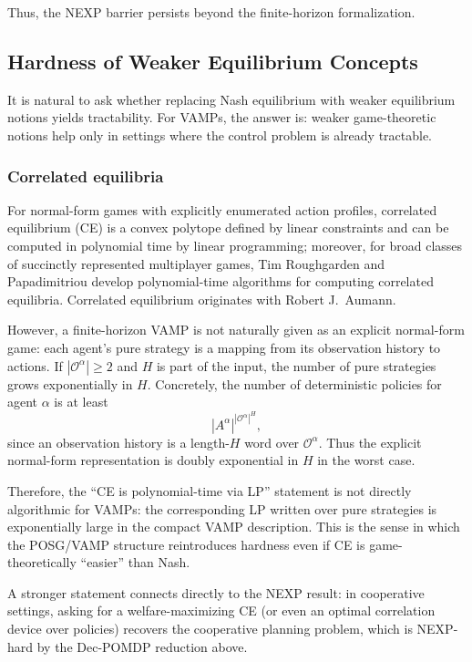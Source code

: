 Thus, the NEXP barrier persists beyond the finite-horizon formalization.

\subsection{Hardness of Weaker Equilibrium Concepts}

It is natural to ask whether replacing Nash equilibrium with weaker equilibrium notions yields tractability. For VAMPs, the answer is: weaker game-theoretic notions help only in settings where the control problem is already tractable.

\subsubsection{Correlated equilibria}

For normal-form games with explicitly enumerated action profiles, correlated equilibrium (CE) is a convex polytope defined by linear constraints and can be computed in polynomial time by linear programming; moreover, for broad classes of succinctly represented multiplayer games, Tim Roughgarden and Papadimitriou develop polynomial-time algorithms for computing correlated equilibria. Correlated equilibrium originates with Robert J.\ Aumann.

However, a finite-horizon VAMP is not naturally given as an explicit normal-form game: each agent's pure strategy is a mapping from its observation history to actions. If \(|\mathcal O^\alpha|\ge 2\) and \(H\) is part of the input, the number of pure strategies grows exponentially in \(H\). Concretely, the number of deterministic policies for agent \(\alpha\) is at least
\[
|A^\alpha|^{|\mathcal O^\alpha|^H},
\]
since an observation history is a length-\(H\) word over \(\mathcal O^\alpha\). Thus the explicit normal-form representation is doubly exponential in \(H\) in the worst case.

Therefore, the ``CE is polynomial-time via LP'' statement is not directly algorithmic for VAMPs: the corresponding LP written over pure strategies is exponentially large in the compact VAMP description. This is the sense in which the POSG/VAMP structure reintroduces hardness even if CE is game-theoretically ``easier'' than Nash.

A stronger statement connects directly to the NEXP result: in cooperative settings, asking for a welfare-maximizing CE (or even an optimal correlation device over policies) recovers the cooperative planning problem, which is NEXP-hard by the Dec-POMDP reduction above.

